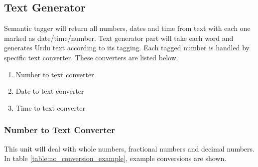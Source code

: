 \begin{table}[]
\centering
{}
\caption{Regular Expression for Semantic Tagger}
\label{table:semantic_tagger_regex}
\end{table}

\subsection{Text Generator}
Semantic tagger will return all numbers, dates and time from text with each one marked as date/time/number. Text generator part will take each word and generates Urdu text according to its tagging. Each tagged number is handled by specific text converter. These converters are listed below.

\begin{enumerate}
  \item Number to text converter
  \item Date to text converter 
  \item Time to text converter
\end{enumerate}

\subsubsection{Number to Text Converter}
This unit will deal with whole numbers, fractional numbers and decimal numbers. In table \ref{table:no_conversion_example}, example conversions are shown. 

